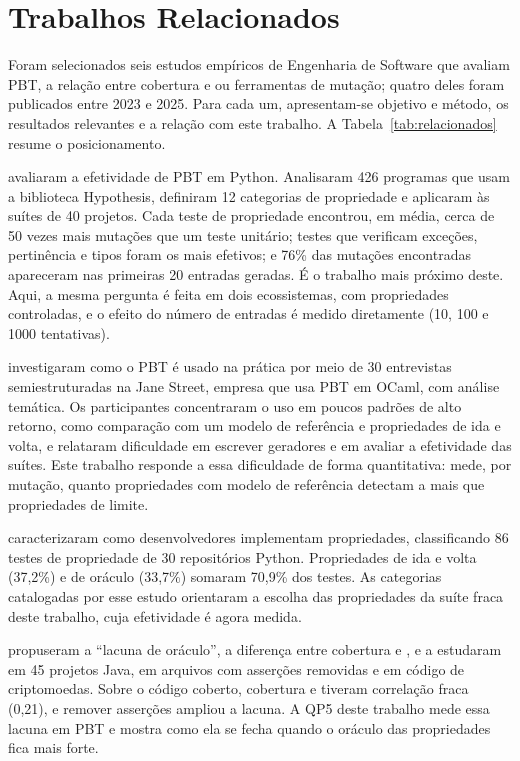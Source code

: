 \section{Trabalhos Relacionados}

Foram selecionados seis estudos empíricos de Engenharia de Software que avaliam PBT, a relação entre cobertura e \MT{} ou ferramentas de mutação; quatro deles foram publicados entre 2023 e 2025. Para cada um, apresentam-se objetivo e método, os resultados relevantes e a relação com este trabalho. A Tabela~\ref{tab:relacionados} resume o posicionamento.

\textbf{\citet{ravi2025pbt}} avaliaram a efetividade de PBT em Python. Analisaram 426 programas que usam a biblioteca Hypothesis, definiram 12 categorias de propriedade e aplicaram \MT{} às suítes de 40 projetos. Cada teste de propriedade encontrou, em média, cerca de 50 vezes mais mutações que um teste unitário; testes que verificam exceções, pertinência e tipos foram os mais efetivos; e 76\% das mutações encontradas apareceram nas primeiras 20 entradas geradas. É o trabalho mais próximo deste. Aqui, a mesma pergunta é feita em dois ecossistemas, com propriedades controladas, e o efeito do número de entradas é medido diretamente (10, 100 e 1000 tentativas).

\textbf{\citet{goldstein2024pbt}} investigaram como o PBT é usado na prática por meio de 30 entrevistas semiestruturadas na Jane Street, empresa que usa PBT em OCaml, com análise temática. Os participantes concentraram o uso em poucos padrões de alto retorno, como comparação com um modelo de referência e propriedades de ida e volta, e relataram dificuldade em escrever geradores e em avaliar a efetividade das suítes. Este trabalho responde a essa dificuldade de forma quantitativa: mede, por mutação, quanto propriedades com modelo de referência detectam a mais que propriedades de limite.

\textbf{\citet{corgozinho2023pbt}} caracterizaram como desenvolvedores implementam propriedades, classificando 86 testes de propriedade de 30 repositórios Python. Propriedades de ida e volta (37,2\%) e de oráculo (33,7\%) somaram 70,9\% dos testes. As categorias catalogadas por esse estudo orientaram a escolha das propriedades da suíte fraca deste trabalho, cuja efetividade é agora medida.

\textbf{\citet{jain2023gap}} propuseram a ``lacuna de oráculo'', a diferença entre cobertura e \ms{}, e a estudaram em 45 projetos Java, em arquivos com asserções removidas e em código de criptomoedas. Sobre o código coberto, cobertura e \ms{} tiveram correlação fraca (0,21), e remover asserções ampliou a lacuna. A QP5 deste trabalho mede essa lacuna em PBT e mostra como ela se fecha quando o oráculo das propriedades fica mais forte.

